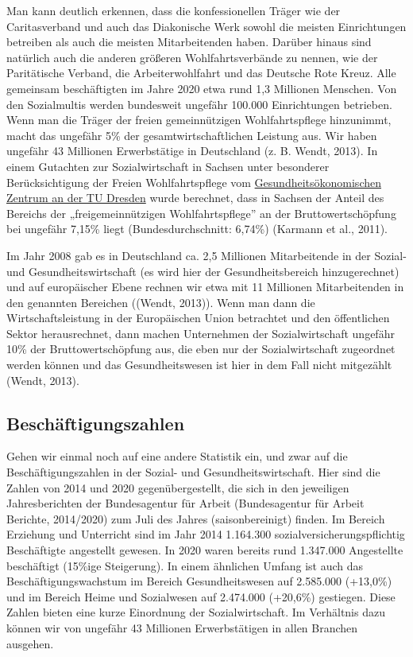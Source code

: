 \documentclass[
  letterpaper,
]{book}
\begin{document}
Man kann deutlich erkennen, dass die konfessionellen Träger wie der
Caritasverband und auch das Diakonische Werk sowohl die meisten
Einrichtungen betreiben als auch die meisten Mitarbeitenden haben.
Darüber hinaus sind natürlich auch die anderen größeren
Wohlfahrtsverbände zu nennen, wie der Paritätische Verband, die
Arbeiterwohlfahrt und das Deutsche Rote Kreuz. Alle gemeinsam
beschäftigten im Jahre 2020 etwa rund 1,3 Millionen Menschen. Von den
Sozialmultis werden bundesweit ungefähr 100.000 Einrichtungen betrieben.
Wenn man die Träger der freien gemeinnützigen Wohlfahrtspflege
hinzunimmt, macht das ungefähr 5\% der gesamtwirtschaftlichen Leistung
aus. Wir haben ungefähr 43 Millionen Erwerbstätige in Deutschland (z. B.
Wendt, 2013). In einem Gutachten zur Sozialwirtschaft in Sachsen unter
besonderer Berücksichtigung der Freien Wohlfahrtspflege vom
\href{https://tu-dresden.de/bu/wirtschaft/wwsprofecon/ressourcen/dateien/publikationen/Sozialwirtschaft_2011.pdf?lang=de}{Gesundheitsökonomischen
Zentrum an der TU Dresden} wurde berechnet, dass in Sachsen der Anteil
des Bereichs der „freigemeinnützigen Wohlfahrtspflege'' an der
Bruttowertschöpfung bei ungefähr 7,15\% liegt (Bundesdurchschnitt:
6,74\%) (Karmann et al., 2011).

Im Jahr 2008 gab es in Deutschland ca. 2,5 Millionen Mitarbeitende in
der Sozial- und Gesundheitswirtschaft (es wird hier der
Gesundheitsbereich hinzugerechnet) und auf europäischer Ebene rechnen
wir etwa mit 11 Millionen Mitarbeitenden in den genannten Bereichen
((Wendt, 2013)). Wenn man dann die Wirtschaftsleistung in der
Europäischen Union betrachtet und den öffentlichen Sektor herausrechnet,
dann machen Unternehmen der Sozialwirtschaft ungefähr 10\% der
Bruttowertschöpfung aus, die eben nur der Sozialwirtschaft zugeordnet
werden können und das Gesundheitswesen ist hier in dem Fall nicht
mitgezählt (Wendt, 2013).

\subsection{Beschäftigungszahlen}\label{beschaeftigungszahlen}

Gehen wir einmal noch auf eine andere Statistik ein, und zwar auf die
Beschäftigungszahlen in der Sozial- und Gesundheitswirtschaft. Hier sind
die Zahlen von 2014 und 2020 gegenübergestellt, die sich in den
jeweiligen Jahresberichten der Bundesagentur für Arbeit (Bundesagentur
für Arbeit Berichte, 2014/2020) zum Juli des Jahres (saisonbereinigt)
finden. Im Bereich Erziehung und Unterricht sind im Jahr 2014 1.164.300
sozialversicherungspflichtig Beschäftigte angestellt gewesen. In 2020
waren bereits rund 1.347.000 Angestellte beschäftigt (15\%ige
Steigerung). In einem ähnlichen Umfang ist auch das
Beschäftigungswachstum im Bereich Gesundheitswesen auf 2.585.000
(+13,0\%) und im Bereich Heime und Sozialwesen auf 2.474.000 (+20,6\%)
gestiegen. Diese Zahlen bieten eine kurze Einordnung der
Sozialwirtschaft. Im Verhältnis dazu können wir von ungefähr 43
Millionen Erwerbstätigen in allen Branchen ausgehen.
\end{document}
